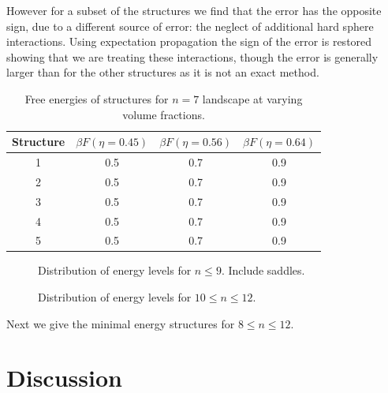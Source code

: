 \documentclass[11pt,twoside]{report}
\begin{document}
However for a subset of the structures we find that the error has the opposite sign, due to a different source of error: the neglect of additional hard sphere interactions.
Using expectation propagation the sign of the error is restored showing that we are treating these interactions, though the error is generally larger than for the other structures as it is not an exact method.

\begin{table}
  \begin{minipage}[b]{\linewidth}
    \centering
    \begin{tabular}{cccc}
      Structure & $\beta F(\eta=0.45)$ & $\beta F(\eta=0.56)$ & $\beta F(\eta=0.64)$ \\
      \hline
      1 & 0.5 & 0.7 & 0.9 \\
      2 & 0.5 & 0.7 & 0.9 \\
      3 & 0.5 & 0.7 & 0.9 \\
      4 & 0.5 & 0.7 & 0.9 \\
      5 & 0.5 & 0.7 & 0.9 \\
    \end{tabular}
  \end{minipage}
  \caption{Free energies of structures for $n=7$ landscape at varying volume fractions.}
\end{table}

\begin{figure}
  \missingfigure[figwidth=\linewidth]{}
  \caption{Distribution of energy levels for $n \le 9$.
  Include saddles.}
\end{figure}

\begin{figure}
  \missingfigure[figwidth=\linewidth]{}
  \caption{Distribution of energy levels for $10 \le n \le 12$.}
\end{figure}

Next we give the minimal energy structures for $8 \le n \le 12$.

\section{Discussion}
\end{document}

